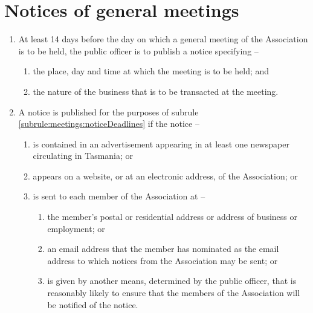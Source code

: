 \section{Notices of general meetings}
\label{rule:meetings}

\begin{enumerate}
	\item \label{subrule:meetings:noticeDeadlines} At least 14 days before the day on which a general meeting of the Association is to be held, the public officer is to publish a notice specifying --
		\begin{enumerate}
			\item the place, day and time at which the meeting is to be held; and
			\item the nature of the business that is to be transacted at the meeting.
		\end{enumerate}
	
	\item \label{subrule:meetings:noticeRequirements} A notice is published for the purposes of subrule \ref{subrule:meetings:noticeDeadlines} if the notice --
	\begin{enumerate}
		\item is contained in an advertisement appearing in at least one newspaper circulating in Tasmania; or
		\item appears on a website, or at an electronic address, of the Association; or
		\item is sent to each member of the Association at --
		\begin{enumerate}
			\item the member's postal or residential address or address of business or employment; or
			\item an email address that the member has nominated as the email address to which notices from the Association may be sent; or
			\item is given by another means, determined by the public officer, that is reasonably likely to ensure that the members of the Association will be notified of the notice.
		\end{enumerate}
	\end{enumerate}
\end{enumerate}